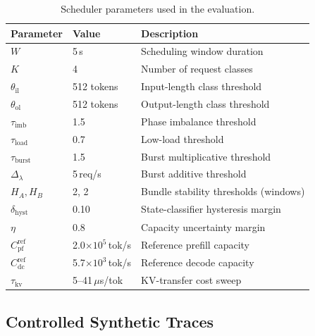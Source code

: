 \begin{table}[t]
    \centering
\caption{Scheduler parameters used in the evaluation.}
    \label{tab:eval_params}
    \small
    \begin{tabular}{@{}lll@{}}
        \toprule
        Parameter & Value & Description \\
        \midrule
        $W$ & 5\,s & Scheduling window duration \\
        $K$ & 4 & Number of request classes \\
        $\theta_{\mathrm{il}}$ & 512 tokens & Input-length class threshold \\
        $\theta_{\mathrm{ol}}$ & 512 tokens & Output-length class threshold \\
        $\tau_{\mathrm{imb}}$ & 1.5 & Phase imbalance threshold \\
        $\tau_{\mathrm{load}}$ & 0.7 & Low-load threshold \\
        $\tau_{\mathrm{burst}}$ & 1.5 & Burst multiplicative threshold \\
        $\Delta_{\lambda}$ & 5\,req/s & Burst additive threshold \\
        $H_A, H_B$ & 2, 2 & Bundle stability thresholds (windows) \\
        $\delta_{\mathrm{hyst}}$ & 0.10 & State-classifier hysteresis margin \\
        $\eta$ & 0.8 & Capacity uncertainty margin \\
        $C_{\mathrm{pf}}^{\mathrm{ref}}$ & 2.0$\times 10^{5}$\,tok/s & Reference prefill capacity \\
        $C_{\mathrm{dc}}^{\mathrm{ref}}$ & 5.7$\times 10^{3}$\,tok/s & Reference decode capacity \\
        $\tau_{\mathrm{kv}}$ & 5--41\,$\mu$s/tok & KV-transfer cost sweep \\
        \bottomrule
    \end{tabular}
\end{table}


\iffalse  %

\subsection{Controlled Synthetic Traces}
\label{sec:eval_synth}

